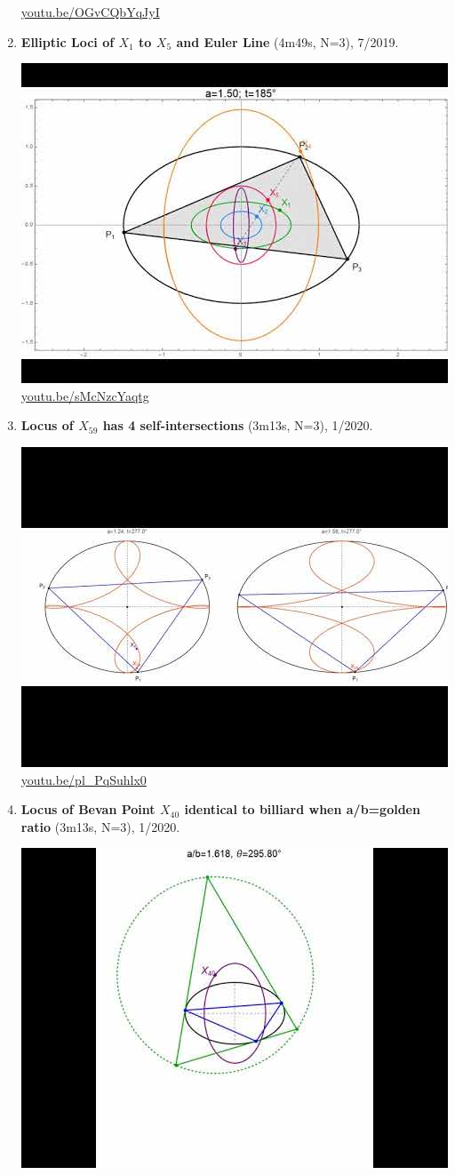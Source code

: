 \documentclass[12pt]{amsart}
\begin{document}
\begin{enumerate}[resume]
\begin{center}
\href{https://youtu.be/OGvCQbYqJyI}{\url{youtu.be/OGvCQbYqJyI}}\end{center}
% 
\item \textbf{Elliptic Loci of $X_{1}$ to $X_{5}$ and Euler Line} (4m49s, N=3), 7/2019. 
\begin{center}\includegraphics[width=.5\textwidth]{pics/sMcNzcYaqtg.jpg} \\ 
\href{https://youtu.be/sMcNzcYaqtg}{\url{youtu.be/sMcNzcYaqtg}}\end{center}
% 
\item \textbf{Locus of $X_{59}$ has 4 self-intersections} (3m13s, N=3), 1/2020. 
\begin{center}\includegraphics[width=.5\textwidth]{pics/pl_PqSuhlx0.jpg} \\ 
\href{https://youtu.be/pl_PqSuhlx0}{\url{youtu.be/pl\_PqSuhlx0}}\end{center}
% 
\item \textbf{Locus of Bevan Point $X_{40}$ identical to billiard when a/b=golden ratio} (3m13s, N=3), 1/2020. 
\begin{center}\includegraphics[width=.5\textwidth]{pics/rg28gGr-Qeo.jpg} \\ 

\end{center}
\end{enumerate}
\end{document}
